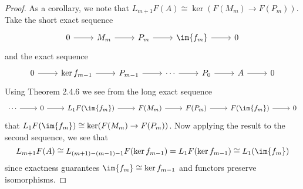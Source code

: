 \documentclass[10pt]{amsart}
\begin{document}
\begin{ex}
\begin{proof}
    As a corollary, we note that $L_{m+1}F(A) \cong \ker(F(M_m) \rightarrow F(P_m))$.
    Take the short exact sequence
    $$\begin{tikzcd}
      0 \arrow{r} & M_m \arrow{r} & P_m \arrow{r} & \im{f_m} \arrow{r} & 0
    \end{tikzcd}$$
    and the exact sequence
    $$\begin{tikzcd}
      0 \arrow{r} & \ker{f_{m-1}} \arrow{r} & P_{m-1} \arrow{r} & \cdots \arrow{r} & P_0 \arrow{r} & A \arrow{r} & 0
    \end{tikzcd}$$
    Using Theorem 2.4.6 we see from the long exact sequence
    $$\begin{tikzcd}
      \cdots \arrow{r} & 0 \arrow{r} & L_1F(\im{f_m}) \arrow{r} & F(M_m) \arrow{r} & F(P_m) \arrow{r} & F(\im{f_m}) \arrow{r} & 0
    \end{tikzcd}$$
    that $L_1F(\im{f_m}) \cong \ker(F(M_m) \rightarrow F(P_m))$.
    Now applying the result to the second sequence, we see that
    $$L_{m+1}F(A) \cong L_{(m+1) - (m-1) - 1}F(\ker{f_{m-1}}) = L_1F(\ker{f_{m-1}}) \cong L_1(\im{f_m})$$
    since exactness guarantees $\im{f_m} \cong \ker{f_{m-1}}$ and functors preserve isomorphisms.
    

\end{proof}
\end{ex}
\end{document}
